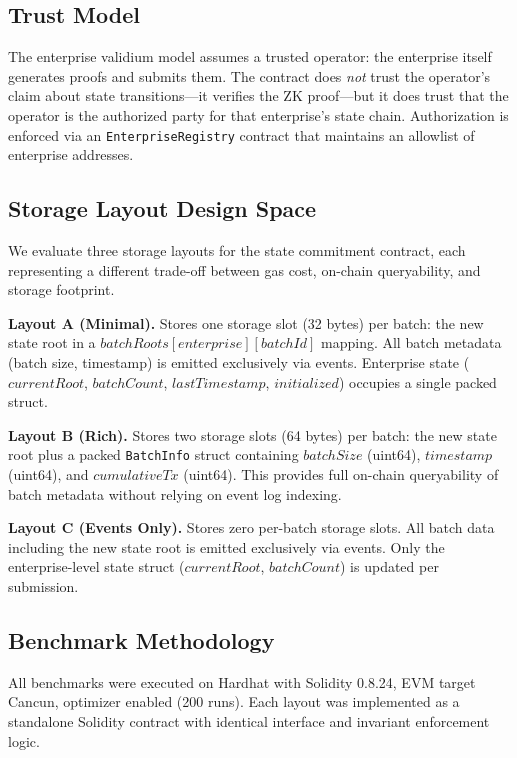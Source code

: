 \subsection{Trust Model}

The enterprise validium model assumes a trusted operator: the enterprise itself generates
proofs and submits them. The contract does \emph{not} trust the operator's claim about state
transitions---it verifies the ZK proof---but it does trust that the operator is the
authorized party for that enterprise's state chain. Authorization is enforced via an
\texttt{EnterpriseRegistry} contract that maintains an allowlist of enterprise addresses.

\subsection{Storage Layout Design Space}

We evaluate three storage layouts for the state commitment contract, each representing a
different trade-off between gas cost, on-chain queryability, and storage footprint.

\textbf{Layout A (Minimal).} Stores one storage slot (32 bytes) per batch: the new state
root in a $\mathit{batchRoots}[\mathit{enterprise}][\mathit{batchId}]$ mapping. All batch
metadata (batch size, timestamp) is emitted exclusively via events. Enterprise state
($\mathit{currentRoot}$, $\mathit{batchCount}$, $\mathit{lastTimestamp}$, $\mathit{initialized}$)
occupies a single packed struct.

\textbf{Layout B (Rich).} Stores two storage slots (64 bytes) per batch: the new state
root plus a packed \texttt{BatchInfo} struct containing $\mathit{batchSize}$ (uint64),
$\mathit{timestamp}$ (uint64), and $\mathit{cumulativeTx}$ (uint64). This provides full
on-chain queryability of batch metadata without relying on event log indexing.

\textbf{Layout C (Events Only).} Stores zero per-batch storage slots. All batch data
including the new state root is emitted exclusively via events. Only the enterprise-level
state struct ($\mathit{currentRoot}$, $\mathit{batchCount}$) is updated per submission.

\subsection{Benchmark Methodology}

All benchmarks were executed on Hardhat with Solidity 0.8.24, EVM target Cancun, optimizer
enabled (200 runs). Each layout was implemented as a standalone Solidity contract with
identical interface and invariant enforcement logic.

